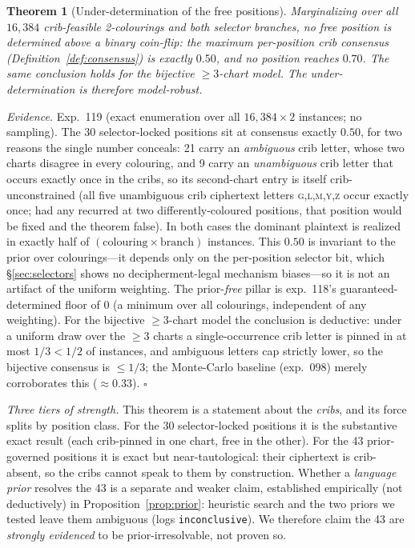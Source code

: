 \documentclass[11pt]{article}
\theoremstyle{plain}
\newtheorem{theorem}{Theorem}
\theoremstyle{definition}
\begin{document}
\begin{theorem}[Under-determination of the free positions]\label{thm:underdet}
Marginalizing over all $16{,}384$ crib-feasible 2-colourings and both selector
branches, no free position is determined above a binary coin-flip: the maximum
per-position crib consensus (Definition~\ref{def:consensus}) is exactly $0.50$, and
no position reaches $0.70$. The same conclusion holds for the bijective $\ge3$-chart
model. The under-determination is therefore \emph{model-robust}.
\end{theorem}
\noindent\emph{Evidence.} Exp.~119 (exact enumeration over all $16{,}384\times2$
instances; no sampling). The 30 selector-locked positions sit at consensus exactly
$0.50$, for two reasons the single number conceals: 21 carry an \emph{ambiguous} crib
letter, whose two charts disagree in every colouring, and 9 carry an
\emph{unambiguous} crib letter that occurs exactly once in the cribs, so its
second-chart entry is itself crib-unconstrained (all five unambiguous crib ciphertext
letters \textsc{g},\textsc{l},\textsc{m},\textsc{y},\textsc{z} occur exactly once; had
any recurred at two differently-coloured positions, that position would be fixed and
the theorem false). In both cases the dominant plaintext is realized in exactly half
of $(\text{colouring}\times\text{branch})$ instances. This $0.50$ is invariant to the
prior over colourings---it depends only on the per-position selector bit, which
\S\ref{sec:selectors} shows no decipherment-legal mechanism biases---so it is not an
artifact of the uniform weighting. The prior-\emph{free} pillar is exp.~118's
guaranteed-determined floor of $0$ (a minimum over all colourings, independent of any
weighting). For the bijective $\ge3$-chart model the conclusion is deductive: under a
uniform draw over the $\ge3$ charts a single-occurrence crib letter is pinned in at
most $1/3<1/2$ of instances, and ambiguous letters cap strictly lower, so the
bijective consensus is $\le1/3$; the Monte-Carlo baseline (exp.~098) merely
corroborates this ($\approx0.33$). \hfill$\square$

\noindent\emph{Three tiers of strength.} This theorem is a statement about the
\emph{cribs}, and its force splits by position class. For the 30 selector-locked
positions it is the substantive exact result (each crib-pinned in one chart, free in
the other). For the 43 prior-governed positions it is exact but near-tautological:
their ciphertext is crib-absent, so the cribs cannot speak to them by construction.
Whether a \emph{language prior} resolves the 43 is a separate and weaker claim,
established empirically (not deductively) in Proposition~\ref{prop:prior}: heuristic
search and the two priors we tested leave them ambiguous (logs \texttt{inconclusive}).
We therefore claim the 43 are \emph{strongly evidenced} to be prior-irresolvable, not
proven so.
\end{document}
